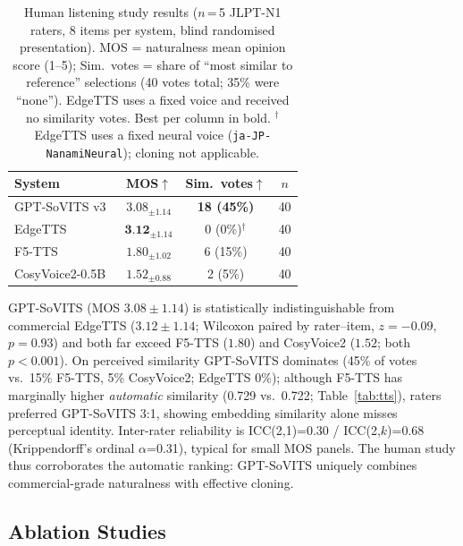 \documentclass[mathematics,article,submit,xetex,moreauthors]{Definitions/mdpi}
\begin{document}
\begin{table}[H]
\centering
\caption{Human listening study results ($n$\,=\,5 JLPT-N1 raters, 8 items per system, blind randomised presentation). MOS = naturalness mean opinion score (1--5); Sim.\ votes = share of ``most similar to reference'' selections (40 votes total; 35\% were ``none''). EdgeTTS uses a fixed voice and received no similarity votes. Best per column in bold. $^{\dagger}$EdgeTTS uses a fixed neural voice (\texttt{ja-JP-NanamiNeural}); cloning not applicable.}
\label{tab:tts_mos}
\begin{tabular}{lccc}
\toprule
\textbf{System} & \textbf{MOS}$\uparrow$ & \textbf{Sim.\ votes}$\uparrow$ & $n$ \\
\midrule
GPT-SoVITS v3~\cite{gptsovits2024}   & $3.08_{\pm1.14}$ & \textbf{18 (45\%)} & 40 \\
EdgeTTS~\cite{edgetts2024}        & $\textbf{3.12}_{\pm1.14}$ & 0 (0\%)$^{\dagger}$ & 40 \\
F5-TTS~\cite{chen2024f5tts}       & $1.80_{\pm1.02}$ & 6 (15\%) & 40 \\
CosyVoice2-0.5B~\cite{cosyvoice2_2024} & $1.52_{\pm0.88}$ & 2 (5\%) & 40 \\
\bottomrule
\end{tabular}
\end{table}

GPT-SoVITS (MOS $3.08\pm1.14$) is statistically indistinguishable from commercial EdgeTTS ($3.12\pm1.14$; Wilcoxon paired by rater--item, $z=-0.09$, $p=0.93$) and both far exceed F5-TTS ($1.80$) and CosyVoice2 ($1.52$; both $p<0.001$).
On perceived similarity GPT-SoVITS dominates (45\% of votes vs.\ 15\% F5-TTS, 5\% CosyVoice2; EdgeTTS 0\%); although F5-TTS has marginally higher \emph{automatic} similarity (0.729 vs.\ 0.722; Table~\ref{tab:tts}), raters preferred GPT-SoVITS 3:1, showing embedding similarity alone misses perceptual identity.
Inter-rater reliability is ICC(2,1)=0.30 / ICC(2,$k$)=0.68 (Krippendorff's ordinal $\alpha$=0.31), typical for small MOS panels.
The human study thus corroborates the automatic ranking: GPT-SoVITS uniquely combines commercial-grade naturalness with effective cloning.

\subsection{Ablation Studies}
\label{sec:ablation}
\end{document}
